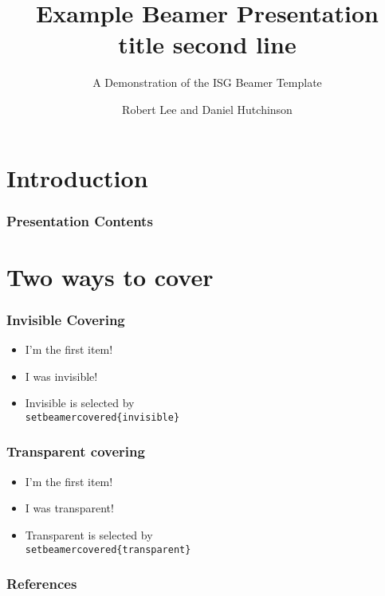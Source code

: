 \documentclass{beamer}
\title{Example Beamer Presentation\\title second line}
\subtitle{A Demonstration of the ISG Beamer Template}
\author[R. Lee \& D. Hutchinson]{Robert Lee and Daniel Hutchinson}
\institute{Information Security Group,\\
Royal Holloway}
\begin{document}
\begin{frame}
\titlepage
\end{frame}
\section{Introduction}


\begin{frame}\frametitle{Presentation Contents}
\tableofcontents
\end{frame}

\section{Two ways to cover}
\begin{frame}\frametitle{Invisible Covering}
\begin{itemize}
\item{I'm the first item!}
\pause
\item{I was invisible!}
\pause
\item Invisible is selected by \texttt{\\setbeamercovered\{invisible\}}
\end{itemize}
\end{frame}


\begin{frame}\frametitle{Transparent covering}
\begin{itemize}
\item{I'm the first item!}
\pause
\item{I was transparent!}
\pause
\item Transparent is selected by \texttt{\\setbeamercovered\{transparent\}}
\end{itemize}
\end{frame}

\begin{frame}[t,allowframebreaks]
\frametitle{References}

\end{frame}
\end{document}
